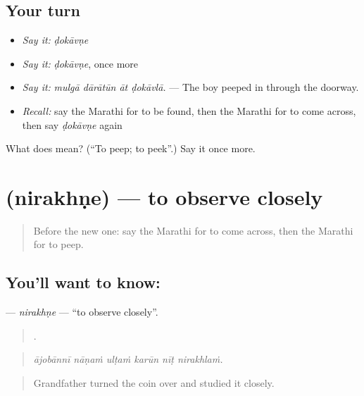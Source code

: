 \subsection*{Your turn}
\begin{itemize}
\raggedright
  \item \emph{Say it:} \emph{ḍokāvṇe}
  \item \emph{Say it:} \emph{ḍokāvṇe}, once more
  \item \emph{Say it:} \emph{mulgā dārātūn āt ḍokāvlā.} — The boy peeped in through the doorway.
  \item \emph{Recall:} say the Marathi for to be found, then the Marathi for to come across, then say \emph{ḍokāvṇe} again
\end{itemize}

\begin{tcolorbox}[breakable,colback=teal!4,colframe=teal!35!black,title={Before you move on}]
What does  mean? (\textquotedblleft{}To peep; to peek\textquotedblright{}.) Say it once more.
\end{tcolorbox}
\section[\texorpdfstring{\mr{निरखणे} (nirakhṇe)}{निरखणे (nirakhṇe)}]{ (nirakhṇe) — to observe closely}

\label{lesson:MR-C301-nirakhne}



\begin{quote}
Before the new one: say the Marathi for to come across, then the Marathi for to peep.
\end{quote}

\subsection*{You'll want to know: }
\textbf{} — \emph{nirakhṇe} — \textquotedblleft{}to observe closely\textquotedblright{}.

\begin{quote}
     .
\end{quote}

\begin{quote}
\emph{ājobānnī nāṇaṁ ulṭaṁ karūn nīṭ nirakhlaṁ.}
\end{quote}

\begin{quote}
Grandfather turned the coin over and studied it closely.
\end{quote}


